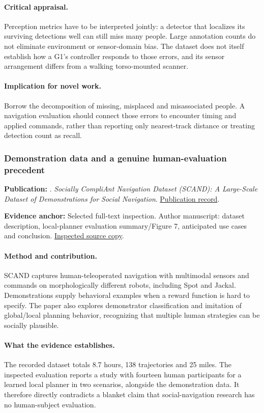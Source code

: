 \paragraph{Critical appraisal.} Perception metrics have to be interpreted jointly: a detector that localizes its surviving detections well can still miss many people. Large annotation counts do not eliminate environment or sensor-domain bias. The dataset does not itself establish how a G1's controller responds to those errors, and its sensor arrangement differs from a walking torso-mounted scanner.

\paragraph{Implication for novel work.} Borrow the decomposition of missing, misplaced and misassociated people. A navigation evaluation should connect those errors to encounter timing and applied commands, rather than reporting only nearest-track distance or treating detection count as recall.

\subsubsection{Demonstration data and a genuine human-evaluation precedent}\label{paper:scand}
\textbf{Publication:} \citet{scand}. \emph{Socially CompliAnt Navigation Dataset (SCAND): A Large-Scale Dataset of Demonstrations for Social Navigation}. \href{https://doi.org/10.1109/lra.2022.3184025}{Publication record}.

\textbf{Evidence anchor:} Selected full-text inspection. Author manuscript: dataset description, local-planner evaluation summary/Figure 7, anticipated use cases and conclusion. \href{https://arxiv.org/pdf/2203.15041}{Inspected source copy}.

\paragraph{Method and contribution.} SCAND captures human-teleoperated navigation with multimodal sensors and commands on morphologically different robots, including Spot and Jackal. Demonstrations supply behavioral examples when a reward function is hard to specify. The paper also explores demonstrator classification and imitation of global/local planning behavior, recognizing that multiple human strategies can be socially plausible.

\paragraph{What the evidence establishes.} The recorded dataset totals 8.7 hours, 138 trajectories and 25 miles. The inspected evaluation reports a study with fourteen human participants for a learned local planner in two scenarios, alongside the demonstration data. It therefore directly contradicts a blanket claim that social-navigation research has no human-subject evaluation.

